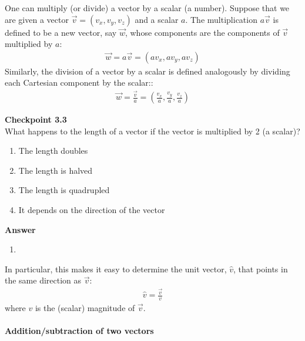 One can multiply (or divide) a vector by a scalar (a number). Suppose that we are given a vector $\vec v=(v_x, v_y, v_z)$ and a scalar $a$. The multiplication $a\vec v$ is defined to be a new vector, say $\vec w$, whose components are the components of $\vec v$ multiplied by $a$:
\begin{align*}
\vec w = a\vec v = (av_x, a v_y, av_z)
\end{align*}
Similarly, the division of a vector by a scalar is defined analogously by dividing each Cartesian component by the scalar::
\begin{align*}
\vec w = \frac{\vec v}{a} = \left(\frac{v_x}{a}, \frac{v_y}{a}, \frac{v_z}{a}\right)
\end{align*}
\begin{framed}
\textbf{Checkpoint 3.3}\\
What happens to the length of a vector if the vector is multiplied by 2 (a scalar)?

\begin{enumerate}
\item The length doubles
\item The length is halved
\item The length is quadrupled
\item It depends on the direction of the vector
\end{enumerate}

\begin{framed}
\textbf{Answer}\\
\begin{enumerate}
\item
\end{enumerate}
\end{framed}
\end{framed}

In particular, this makes it easy to determine the unit vector, $\hat v$, that points in the same direction as $\vec v$:
\begin{align*}
\hat v = \frac{\vec v}{v}
\end{align*}
where $v$ is the (scalar) magnitude of $\vec v$.

\paragraph{Addition/subtraction of two vectors}

